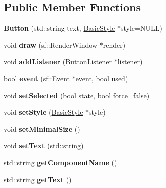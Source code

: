 \subsection*{Public Member Functions}
\begin{DoxyCompactItemize}
\item 
\hypertarget{classgraphics_1_1_button_a9babfdc4fece1ba14ee5661b75a2dd61}{{\bfseries Button} (std\-::string text, \hyperlink{classgraphics_1_1_basic_style}{Basic\-Style} $\ast$style=N\-U\-L\-L)}\label{classgraphics_1_1_button_a9babfdc4fece1ba14ee5661b75a2dd61}

\item 
\hypertarget{classgraphics_1_1_button_a36565cef4d9b53da4599a0b162a3ec35}{void {\bfseries draw} (sf\-::\-Render\-Window $\ast$render)}\label{classgraphics_1_1_button_a36565cef4d9b53da4599a0b162a3ec35}

\item 
\hypertarget{classgraphics_1_1_button_addb045b6c5876c791de9452bd64b69e6}{void {\bfseries add\-Listener} (\hyperlink{classgraphics_1_1_button_listener}{Button\-Listener} $\ast$listener)}\label{classgraphics_1_1_button_addb045b6c5876c791de9452bd64b69e6}

\item 
\hypertarget{classgraphics_1_1_button_acfdfbc2388221c65df1f04cc952ffe6c}{bool {\bfseries event} (sf\-::\-Event $\ast$event, bool used)}\label{classgraphics_1_1_button_acfdfbc2388221c65df1f04cc952ffe6c}

\item 
\hypertarget{classgraphics_1_1_button_abe4dbaffc249969a743aa2a48b72b739}{void {\bfseries set\-Selected} (bool state, bool force=false)}\label{classgraphics_1_1_button_abe4dbaffc249969a743aa2a48b72b739}

\item 
\hypertarget{classgraphics_1_1_button_a854ca251865dc5dfd09853e7d4eb9177}{void {\bfseries set\-Style} (\hyperlink{classgraphics_1_1_basic_style}{Basic\-Style} $\ast$style)}\label{classgraphics_1_1_button_a854ca251865dc5dfd09853e7d4eb9177}

\item 
\hypertarget{classgraphics_1_1_button_a18520c8493028b36106f928cea26ece9}{void {\bfseries set\-Minimal\-Size} ()}\label{classgraphics_1_1_button_a18520c8493028b36106f928cea26ece9}

\item 
\hypertarget{classgraphics_1_1_button_a83cbd19c01ba1d70502518d112601073}{void {\bfseries set\-Text} (std\-::string)}\label{classgraphics_1_1_button_a83cbd19c01ba1d70502518d112601073}

\item 
\hypertarget{classgraphics_1_1_button_a8817442f4d73d6df825a93e2f68a3cbe}{std\-::string {\bfseries get\-Component\-Name} ()}\label{classgraphics_1_1_button_a8817442f4d73d6df825a93e2f68a3cbe}

\item 
\hypertarget{classgraphics_1_1_button_ad14eb278d1fd529af7df9f84ea284afd}{std\-::string {\bfseries get\-Text} ()}\label{classgraphics_1_1_button_ad14eb278d1fd529af7df9f84ea284afd}

\end{DoxyCompactItemize}

